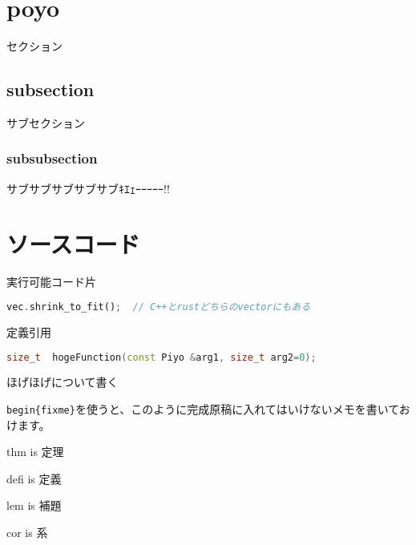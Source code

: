 \documentclass[../book.tex]{subfiles}
\begin{document}
\label{14-poyotaro:ch:create-poyopoyo}

\section{poyo}
    セクション

    \subsection{subsection}
        サブセクション

        \subsubsection{subsubsection}
            サブサブサブサブサブｷｴｪｰｰｰｰｰ!!

\section{ソースコード}

    実行可能コード片

    \noindent\begin{minipage}{\textwidth}\mbox{}
\begin{lstlisting}[language=rust,style=code,caption={コードの例}]
vec.shrink_to_fit();  // C++とrustどちらのvectorにもある
\end{lstlisting}%
    \end{minipage}

    定義引用

    \noindent\begin{minipage}{\textwidth}\mbox{}
\begin{lstlisting}[language=c++,style=decleration,caption={宣言の例}]
size_t  hogeFunction(const Piyo &arg1, size_t arg2=0);
\end{lstlisting}%
    \end{minipage}

    \begin{fixme}
        ほげほげについて書く

        \lstinline[language=tex]|begin{fixme}|を使うと、このように完成原稿に入れてはいけないメモを書いておけます。
    \end{fixme}

    \begin{thm}
        thm is 定理
    \end{thm}
    \begin{defi}
        defi is 定義
    \end{defi}
    \begin{lem}
        lem is 補題
    \end{lem}
    \begin{cor}
        cor is 系
    \end{cor}
\end{document}
